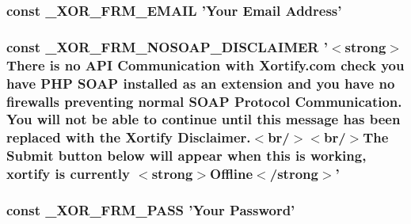 \hypertarget{modinfo_8php_a8bf3964f64499bbc2f5e9e5d1e99dfa4}{
\subsubsection[{\-\_\-\-X\-O\-R\-\_\-\-F\-R\-M\-\_\-\-E\-M\-A\-I\-L}]{\setlength{\rightskip}{0pt plus 5cm}const \-\_\-\-X\-O\-R\-\_\-\-F\-R\-M\-\_\-\-E\-M\-A\-I\-L 'Your Email Address'}}\label{modinfo_8php_a8bf3964f64499bbc2f5e9e5d1e99dfa4}
\hypertarget{modinfo_8php_a4bd036c1fe4b9888fa44bc36168c0900}{
\subsubsection[{\-\_\-\-X\-O\-R\-\_\-\-F\-R\-M\-\_\-\-N\-O\-S\-O\-A\-P\-\_\-\-D\-I\-S\-C\-L\-A\-I\-M\-E\-R}]{\setlength{\rightskip}{0pt plus 5cm}const \-\_\-\-X\-O\-R\-\_\-\-F\-R\-M\-\_\-\-N\-O\-S\-O\-A\-P\-\_\-\-D\-I\-S\-C\-L\-A\-I\-M\-E\-R '$<$strong$>$There is no A\-P\-I Communication with Xortify.\-com check you have P\-H\-P {\bf S\-O\-A\-P} installed as an extension and you have no firewalls preventing normal {\bf S\-O\-A\-P} Protocol Communication. You will not be able to continue until this message has been replaced with the Xortify Disclaimer.$<$br/$>$$<$br/$>$The Submit button below will appear when this is working, xortify is currently $<$strong$>$Offline$<$/strong$>$'}}\label{modinfo_8php_a4bd036c1fe4b9888fa44bc36168c0900}
\hypertarget{modinfo_8php_aa2de0bd8f44fcfb1c248ebdd0086632a}{
\subsubsection[{\-\_\-\-X\-O\-R\-\_\-\-F\-R\-M\-\_\-\-P\-A\-S\-S}]{\setlength{\rightskip}{0pt plus 5cm}const \-\_\-\-X\-O\-R\-\_\-\-F\-R\-M\-\_\-\-P\-A\-S\-S 'Your Password'}}\label{modinfo_8php_aa2de0bd8f44fcfb1c248ebdd0086632a}
